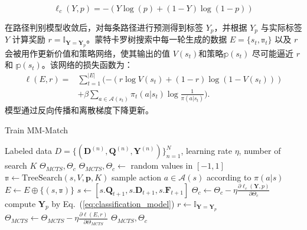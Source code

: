 \begin{equation}
\label{eq:classification_loss}
\ell_c(Y, p) = -\left(Y\log(p) + (1-Y)\log (1-p)\right)
\end{equation}

在路径判别模型收敛后，对每条路径进行预测得到标签 $Y_p$，并根据 $Y_p$ 与实际标签 $Y$ 计算奖励 $r= \mathbb{I}_{\mathbf{Y} = \mathbf{Y}_p}$。蒙特卡罗树搜索中每一轮生成的数据 $E=\{s_t, \mathbb{\pi}_t\}$ 以及 $r$ 会被用作更新价值和策略网络，使其输出的值 $V(s_t)$和策略$\mathbb{p}(s_t)$ 尽可能逼近 $r$ 和 $\mathbb{p}(s_t)$。该网络的损失函数为：
\begin{equation}
\label{eq:loss}
\begin{aligned}
  \ell(E, r) = &\sum_{t=1}^{|E|} (-(r\log V(s_t) + (1-r)\log (1-V(s_t)))  \\
  &+ \beta\sum_{a\in\mathcal{A}(s_t)}\pi_t(a|s_t) \log \frac{1}{\pi(a|s_t)}).
\end{aligned}
\end{equation}
模型通过反向传播和离散梯度下降更新。

\begin{algorithm}[!htbp]
\caption{Train MM-Match}\label{alg:Train}
\renewcommand{\algorithmicrequire}{\textbf{Input:}}
\renewcommand{\algorithmicensure}{\textbf{Output:}}
\begin{algorithmic}[1]
\Require Labeled data $D=\{ (\mathbf{D}^{(n)}, \mathbf{Q}^{(n)}, \mathbf{Y}^{(n)})\}_{n=1}^N$, learning rate $\eta$, number of search $K$
\Ensure $\Theta_{MCTS}, \Theta_{c}$
\State {} $\Theta_{MCTS}, \Theta_{c} \leftarrow$ random values in $[-1, 1]$
\Repeat
            \State $\mathbb{\pi} \leftarrow \mathrm{TreeSearch}(s, V, \mathbf{p}, K)$ 
      \State sample action ${a\in\mathcal{A}(s)}$ according to $\pi(a|s)$
      \State $E\leftarrow E \oplus \{(s, \mathbb{\pi})\}$
      \State $s \leftarrow [s.\mathbf{Q}_{t+1}, s.\mathbf{D}_{t+1}, s.\mathbf{F}_{t+1}]$
    \EndWhile
    \State $\Theta_{c} \leftarrow \Theta_{c} - \eta \frac{\partial \ell_c(\mathbf{Y}, p)}{\partial \Theta_{c}}$  
    \EndWhile
    \State compute $\mathbf{Y}_p$ by Eq.~(\ref{eq:classification_model})
    \State $r \leftarrow \mathbb{I}_{\mathbf{Y} = \mathbf{Y}_p}$
    \State $\Theta_{MCTS} \leftarrow \Theta_{MCTS} -\eta \frac{\partial \ell(E, r)}{\partial \Theta_{MCTS}}$ 
  \EndFor
{}
\State\Return $\Theta_{MCTS}, \Theta_{c}$
\end{algorithmic}
\end{algorithm}

